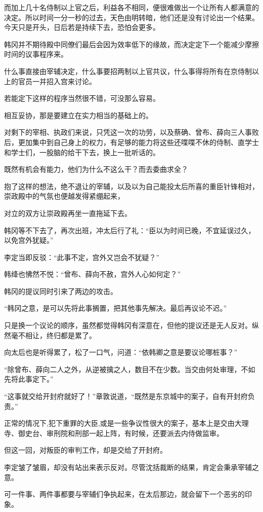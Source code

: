 而加上几十名侍制以上官之后，利益各不相同，便很难做出一个让所有人都满意的决定。所以时间一分一秒的过去，天色由明转暗，他们还是没有讨论出一个结果。今天只是开头，日后若是持续下去，恐怕会更多。

韩冈并不期待殿中同僚们最后会因为效率低下的缘故，而决定定下一个能减少摩擦时间的议事程序来。

什么事直接由宰辅决定，什么事要招两制以上官共议，什么事得将所有在京侍制以上的官员一并招入宫来讨论。

若能定下这样的程序当然很不错，可没那么容易。

相互妥协，那是要建立在实力相当的基础上的。

对剩下的宰相、执政们来说，只凭这一次的功劳，以及蔡确、曾布、薛向三人事败后，更加集中到自己身上的权力，有足够的能力将这些还喋喋不休的侍制、直学士和学士们，一股脑的给干下去，换上一批听话的。

既然有机会有能力，他们为什么不这么干？而去委曲求全？

抱了这样的想法，绝不退让的宰辅，以及以为自己能投太后所喜的重臣针锋相对，崇政殿中的气氛也便越发得紧绷起来，

对立的双方让崇政殿再坐一直拖延下去。

韩冈等不下去了，再次出班，冲太后行了礼：“臣以为时间已晚，不宜延误过久，以免宫外犹疑。”

李定当即反驳：“此事不定，宫外又岂会不犹疑？”

韩绛也怫然不悦：“曾布、薛向不赦，宫外人心如何定？”

韩冈的提议同时引来了两边的攻击。

“韩冈之意，是可以先将此事搁置，把其他事先解决。最后再议论不迟。”

只是换一个议论的顺序，虽然都觉得韩冈有深意在，但他的提议还是无人反对。纵然毫不相让，终归都是累了。

向太后也是听得累了，松了一口气，问道：“依韩卿之意是要议论哪桩事？”

“除曾布、薛向二人之外，从逆被擒之人，数目不在少数。当交由何处审理，不如先将此事定下。”

“这事就交给开封府就好了！”章敦说道，“既然是东京城中的案子，自有开封府负责。”

正常的情况下,犯下重罪的大臣,或是一些争议性很大的案子，基本上是交由大理寺、御史台、审刑院和刑部一起上阵，有时候，还要派去内侍做监审。

但这一回，对叛臣的审判工作，却是交给了开封府。

李定皱了皱眉，却没有站出来表示反对。尽管沈括裁断的结果，肯定会秉承宰辅之意。

可一件事、两件事都要与宰辅们争执起来，在太后那边，就会留下一个恶劣的印象。

